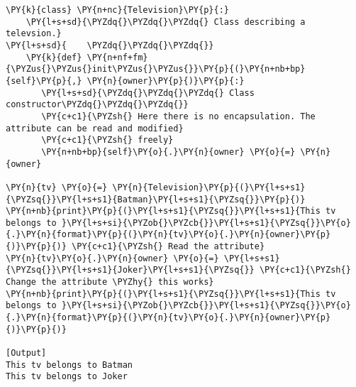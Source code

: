 \begin{Verbatim}[label=\makebox{\url{https://github.com/lucabaldini/cmepda/tree/master/slides/latex/snippets/class\_tv\_encapsulation\_none.py}},commandchars=\\\{\}]
\PY{k}{class} \PY{n+nc}{Television}\PY{p}{:}
    \PY{l+s+sd}{\PYZdq{}\PYZdq{}\PYZdq{} Class describing a televsion.}
\PY{l+s+sd}{    \PYZdq{}\PYZdq{}\PYZdq{}}
    \PY{k}{def} \PY{n+nf+fm}{\PYZus{}\PYZus{}init\PYZus{}\PYZus{}}\PY{p}{(}\PY{n+nb+bp}{self}\PY{p}{,} \PY{n}{owner}\PY{p}{)}\PY{p}{:}
       \PY{l+s+sd}{\PYZdq{}\PYZdq{}\PYZdq{} Class constructor\PYZdq{}\PYZdq{}\PYZdq{}}
       \PY{c+c1}{\PYZsh{} Here there is no encapsulation. The attribute can be read and modified}
       \PY{c+c1}{\PYZsh{} freely}
       \PY{n+nb+bp}{self}\PY{o}{.}\PY{n}{owner} \PY{o}{=} \PY{n}{owner}
       
\PY{n}{tv} \PY{o}{=} \PY{n}{Television}\PY{p}{(}\PY{l+s+s1}{\PYZsq{}}\PY{l+s+s1}{Batman}\PY{l+s+s1}{\PYZsq{}}\PY{p}{)}
\PY{n+nb}{print}\PY{p}{(}\PY{l+s+s1}{\PYZsq{}}\PY{l+s+s1}{This tv belongs to }\PY{l+s+si}{\PYZob{}\PYZcb{}}\PY{l+s+s1}{\PYZsq{}}\PY{o}{.}\PY{n}{format}\PY{p}{(}\PY{n}{tv}\PY{o}{.}\PY{n}{owner}\PY{p}{)}\PY{p}{)} \PY{c+c1}{\PYZsh{} Read the attribute}
\PY{n}{tv}\PY{o}{.}\PY{n}{owner} \PY{o}{=} \PY{l+s+s1}{\PYZsq{}}\PY{l+s+s1}{Joker}\PY{l+s+s1}{\PYZsq{}} \PY{c+c1}{\PYZsh{} Change the attribute \PYZhy{} this works}
\PY{n+nb}{print}\PY{p}{(}\PY{l+s+s1}{\PYZsq{}}\PY{l+s+s1}{This tv belongs to }\PY{l+s+si}{\PYZob{}\PYZcb{}}\PY{l+s+s1}{\PYZsq{}}\PY{o}{.}\PY{n}{format}\PY{p}{(}\PY{n}{tv}\PY{o}{.}\PY{n}{owner}\PY{p}{)}\PY{p}{)}

[Output]
This tv belongs to Batman
This tv belongs to Joker
\end{Verbatim}